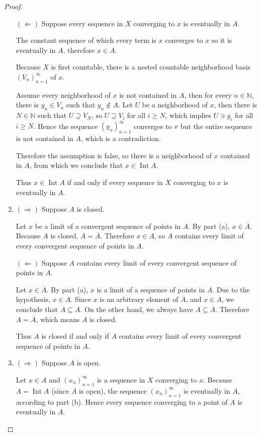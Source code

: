 \begin{proof}
\begin{enumerate}[label={(\alph*)}]
		      $(\Leftarrow)$ Suppose every sequence in $X$ converging to $x$ is eventually in $A$.

		      The constant sequence of which every term is $x$ converges to $x$ so it is eventually in $A$, therefore $x\in A$.

		      Because $X$ is first countable, there is a nested countable neighborhood basis ${(V_{n})}^{\infty}_{n=1}$ of $x$.

		      Assume every neighborhood of $x$ is not contained in $A$, then for every $n\in\mathbb{N}$, there is $y_{n}\in V_{n}$ such that $y_{n}\notin A$. Let $U$ be a neighborhood of $x$, then there is $N\in\mathbb{N}$ such that $U\supseteq V_{N}$, so $U\supseteq V_{i}$ for all $i\geq N$, which implies $U\ni y_{i}$ for all $i\geq N$. Hence the sequence ${(y_{n})}^{\infty}_{n=1}$ converges to $x$ but the entire sequence is not contained in $A$, which is a contradiction.

		      Therefore the assumption is false, so there is a neighborhood of $x$ contained in $A$, from which we conclude that $x\in\operatorname{Int}A$.

		      Thus $x\in\operatorname{Int}A$ if and only if every sequence in $X$ converging to $x$ is eventually in $A$.
		\item $(\Rightarrow)$ Suppose $A$ is closed.

		      Let $x$ be a limit of a convergent sequence of points in $A$. By part (a), $x\in \overline{A}$. Because $A$ is closed, $A = \overline{A}$. Therefore $x\in A$, so $A$ contains every limit of every convergent sequence of points in $A$.

		      $(\Leftarrow)$ Suppose $A$ contains every limit of every convergent sequence of points in $A$.

		      Let $x\in\overline{A}$. By part (a), $x$ is a limit of a sequence of points in $A$. Due to the hypothesis, $x\in A$. Since $x$ is an arbitrary element of $\overline{A}$, and $x\in A$, we conclude that $\overline{A}\subseteq A$. On the other hand, we always have $A\subseteq \overline{A}$. Therefore $A = \overline{A}$, which means $A$ is closed.

		      Thus $A$ is closed if and only if $A$ contains every limit of every convergent sequence of points in $A$.
		\item $(\Rightarrow)$ Suppose $A$ is open.

		      Let $x\in A$ and ${(x_{n})}^{\infty}_{n=1}$ is a sequence in $X$ converging to $x$. Because $A = \operatorname{Int} A$ (since $A$ is open), the sequence ${(x_{n})}^{\infty}_{n=1}$ is eventually in $A$, according to part (b). Hence every sequence converging to a point of $A$ is eventually in $A$.


\end{enumerate}
\end{proof}
